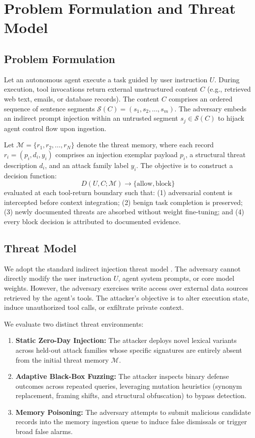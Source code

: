 \documentclass[conference]{IEEEtran}
\begin{document}
\section{Problem Formulation and Threat Model}
\subsection{Problem Formulation}
Let an autonomous agent execute a task guided by user instruction $U$. During execution, tool invocations return external unstructured content $C$ (e.g., retrieved web text, emails, or database records). The content $C$ comprises an ordered sequence of sentence segments $\mathcal{S}(C) = (s_1, s_2, \dots, s_m)$. The adversary embeds an indirect prompt injection within an untrusted segment $s_j \in \mathcal{S}(C)$ to hijack agent control flow upon ingestion.

Let $\mathcal{M} = \{r_1, r_2, \dots, r_N\}$ denote the threat memory, where each record $r_i = (p_i, d_i, y_i)$ comprises an injection exemplar payload $p_i$, a structural threat description $d_i$, and an attack family label $y_i$. The objective is to construct a decision function:
\begin{equation}
D(U, C; \mathcal{M}) \rightarrow \{\text{allow}, \text{block}\}
\end{equation}
evaluated at each tool-return boundary such that: (1) adversarial content is intercepted before context integration; (2) benign task completion is preserved; (3) newly documented threats are absorbed without weight fine-tuning; and (4) every block decision is attributed to documented evidence.

\subsection{Threat Model}
We adopt the standard indirect injection threat model \cite{debenedetti2024agentdojo, zhan2024injecagent}. The adversary cannot directly modify the user instruction $U$, agent system prompts, or core model weights. However, the adversary exercises write access over external data sources retrieved by the agent's tools. The attacker's objective is to alter execution state, induce unauthorized tool calls, or exfiltrate private context.

We evaluate two distinct threat environments:
\begin{enumerate}
    \item \textbf{Static Zero-Day Injection:} The attacker deploys novel lexical variants across held-out attack families whose specific signatures are entirely absent from the initial threat memory $\mathcal{M}$.
    \item \textbf{Adaptive Black-Box Fuzzing:} The attacker inspects binary defense outcomes across repeated queries, leveraging mutation heuristics (synonym replacement, framing shifts, and structural obfuscation) to bypass detection.
    \item \textbf{Memory Poisoning:} The adversary attempts to submit malicious candidate records into the memory ingestion queue to induce false dismissals or trigger broad false alarms.
\end{enumerate}
\end{document}
